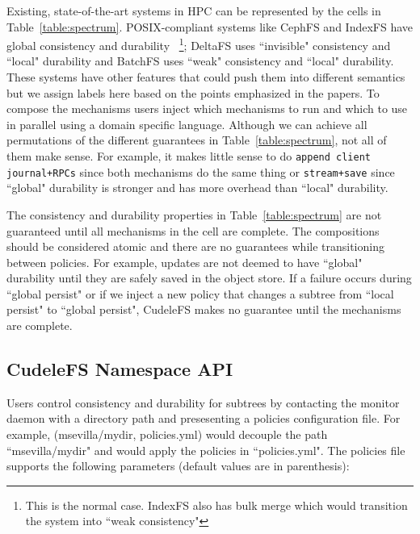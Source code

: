 Existing, state-of-the-art systems in HPC can be represented by the cells in
Table~\ref{table:spectrum}.  POSIX-compliant systems like CephFS and IndexFS
have global consistency and durability ~\footnote{This is the normal case.
IndexFS also has bulk merge which would transition the system into ``weak
consistency"}; DeltaFS uses ``invisible" consistency and ``local" durability
and BatchFS uses ``weak" consistency and ``local" durability. These systems
have other features that could push them into different semantics but we assign
labels here based on the points emphasized in the papers.  To compose the
mechanisms users inject which mechanisms to run and which to use in parallel
using a domain specific language.  Although we can achieve all permutations of
the different guarantees in Table~\ref{table:spectrum}, not all of them make
sense. For example, it makes little sense to do \texttt{append client journal+RPCs} since
both mechanisms do the same thing or \texttt{stream+save} since ``global"
durability is stronger and has more overhead than ``local" durability. 

The consistency and durability properties in Table~\ref{table:spectrum} are not
guaranteed until all mechanisms in the cell are complete. The compositions
should be considered atomic and there are no guarantees while transitioning
between policies. For example, updates are not deemed to have ``global" durability until
they are safely saved in the object store. If a failure occurs during ``global
persist" or if we inject a new policy that changes a subtree from ``local
persist" to ``global persist", CudeleFS makes no guarantee until the mechanisms are
complete.

\subsection{CudeleFS Namespace API}
\label{sec:cudelefs-namespace-api}



Users control consistency and durability for subtrees by contacting the monitor
daemon with a directory path and presesenting a policies configuration file.
For example, (msevilla/mydir, policies.yml) would decouple the path
``msevilla/mydir" and would apply the policies in ``policies.yml".  The
policies file supports the following parameters (default values are in parenthesis):

